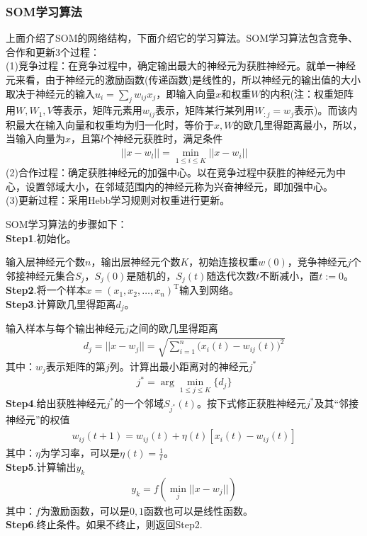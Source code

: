 {        \subsubsection{SOM学习算法}
            \par
            上面介绍了SOM的网络结构，下面介绍它的学习算法。SOM学习算法包含竞争、合作和更新3个过程：\\
            (1)竞争过程：在竞争过程中，确定输出最大的神经元为获胜神经元。就单一神经元来看，由于神经元的激励函数(传递函数)是线性的，所以神经元的输出值的大小取决于神经元的输入$u_i = \sum_j w_{ij}x_j$，即输入向量$x$和权重$W$的内积(注：权重矩阵用$W,W_1,V$等表示，矩阵元素用$w_{ij}$表示，矩阵某行某列用$W_{:j} = w_j$表示)。而该内积最大在输入向量和权重均为归一化时，等价于$x,W$的欧几里得距离最小，所以，当输入向量为$x$，且第$l$个神经元获胜时，满足条件
            \begin{align*}
            ||x-w_l|| = \min_{1 \leqslant i \leqslant K} ||x-w_i||
            \end{align*}
            (2)合作过程：确定获胜神经元的加强中心。以在竞争过程中获胜的神经元为中心，设置邻域大小，在邻域范围内的神经元称为兴奋神经元，即加强中心。\\
            (3)更新过程：采用Hebb学习规则对权重进行更新。
            \par
            SOM学习算法的步骤如下：\\
            \textbf{Step1}.初始化。\par
            输入层神经元个数$n$，输出层神经元个数$K$，初始连接权重$w(0)$，竞争神经元$j$个邻接神经元集合$S_j$，$S_j(0)$是随机的，$S_j(t)$随迭代次数$t$不断减小，置$t:=0$。\\
            \textbf{Step2}.将一个样本$x=(x_1,x_2,\dots,x_n)^\mathrm{T}$输入到网络。\\
            \textbf{Step3}.计算欧几里得距离$d_j$。\par
            输入样本与每个输出神经元$j$之间的欧几里得距离
            \begin{align*}
            d_j = ||x-w_j|| = \sqrt{\sum_{i=1}^n\Big(x_i(t) - w_{ij}(t)\Big)^2}
            \end{align*}
            其中：$w_j$表示矩阵的第$j$列。计算出最小距离对的神经元$j^*$
            \begin{align*}
            j^* = \arg \min_{1 \leqslant j \leqslant K} \{d_j\}
            \end{align*}
            \textbf{Step4}.给出获胜神经元$j^*$的一个邻域$S_{j^*}(t)$。按下式修正获胜神经元$j^*$及其“邻接神经元”的权值
            \begin{align*}
            w_{ij}(t+1) =w_{ij}(t) + \eta(t)[x_i(t) - w_{ij}(t)]
            \end{align*}
            其中：$\eta$为学习率，可以是$\eta(t) = \frac{1}{t}$。\\
            \textbf{Step5}.计算输出$y_k$
            \begin{align*}
            y_k = f(\min_j ||x - w_j||)
            \end{align*}
            其中：$f$为激励函数，可以是$0,1$函数也可以是线性函数。\\
            \textbf{Step6}.终止条件。如果不终止，则返回Step2.
}
